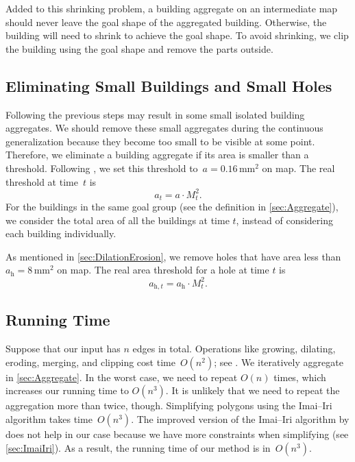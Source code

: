 Added to this shrinking problem, 
a building aggregate on an intermediate map should never leave
the goal shape of the aggregated building. 
Otherwise, the building will need to shrink 
to achieve the goal shape.
To avoid shrinking, 
we clip the building using the goal shape 
and remove the parts outside.


\subsection{Eliminating Small Buildings and Small Holes}
\label{sec:Eliminate}
Following the previous steps may result in 
some small isolated building aggregates.
We should remove these small aggregates during
the continuous generalization 
because they become too small to be visible at some point.
Therefore, we eliminate a building aggregate if its area is 
smaller than a threshold.
Following \citet{Stoter2009,Chaudhry2008}, 
we set this threshold to~$a=0.16\,\mathrm{mm}^2$ on map.
The real threshold at time~$t$ is
\[
a_t=a\cdot M_t^2.
\]
For the buildings in the same goal group 
(see the definition in \sect\ref{sec:Aggregate}),
we consider the total area of all the buildings at time $t$, 
instead of considering each building individually.

As mentioned in \sect\ref{sec:DilationErosion}, 
we remove holes that have area less than 
$a_\mathrm{h} = 8\,\mathrm{mm}^2$ on map.
The real area threshold for a hole at time $t$ is
\[
a_{\mathrm{h},t}=a_\mathrm{h}\cdot M_t^2.
\]

\subsection{Running Time}
Suppose that our input has $n$ edges in total.
Operations like growing, dilating, 
eroding, merging, and clipping 
cost time~$O(n^2)$; see \citet{Greiner1998Clipping,Palfrader2015}.
We iteratively aggregate in \sect\ref{sec:Aggregate}.
In the worst case, we need to repeat $O(n)$ times,
which increases our running time to $O(n^3)$.
It is unlikely that 
we need to repeat the aggregation more than twice, though.
Simplifying polygons using the Imai--Iri algorithm 
takes time~$O(n^3)$.
The improved version of the Imai--Iri algorithm by 
\citet{Chan1996} does not help in our case
because we have more constraints when simplifying
(see \sect\ref{sec:ImaiIri}).
As a result, the running time of our method is in~$O(n^3)$.


